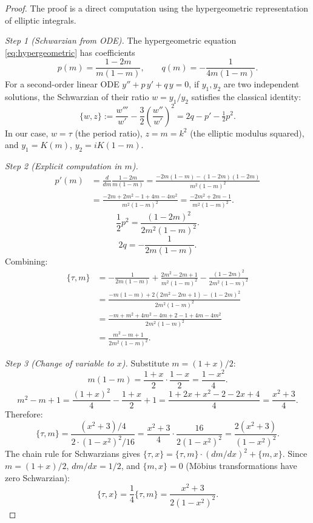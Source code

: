 \documentclass[12pt]{article}
\theoremstyle{plain}
\theoremstyle{definition}
\numberwithin{equation}{section}
\begin{document}
\begin{proof}
The proof is a direct computation using the hypergeometric representation of elliptic integrals.

\emph{Step 1 (Schwarzian from ODE).}
The hypergeometric equation \eqref{eq:hypergeometric} has coefficients
\begin{equation}
p(m)=\frac{1-2m}{m(1-m)},\qquad q(m)=-\frac{1}{4m(1-m)}.
\end{equation}
For a second-order linear ODE $y''+p\,y'+q\,y=0$, if $y_1,y_2$ are two independent solutions, the Schwarzian of their ratio $w=y_1/y_2$ satisfies the classical identity:
\begin{equation}
\{w,z\} := \frac{w'''}{w'}-\frac{3}{2}\left(\frac{w''}{w'}\right)^2 = 2q-p'-\tfrac{1}{2}p^2.
\end{equation}
In our case, $w=\tau$ (the period ratio), $z=m=k^2$ (the elliptic modulus squared), and $y_1=K(m)$, $y_2=iK(1-m)$.

\emph{Step 2 (Explicit computation in $m$).}
\begin{align}
p'(m) &= \frac{d}{dm}\frac{1-2m}{m(1-m)} = \frac{-2m(1-m)-(1-2m)(1-2m)}{m^2(1-m)^2}\\
&= \frac{-2m+2m^2-1+4m-4m^2}{m^2(1-m)^2} = \frac{-2m^2+2m-1}{m^2(1-m)^2}.
\end{align}
\begin{equation}
\frac{1}{2}p^2 = \frac{(1-2m)^2}{2m^2(1-m)^2}.
\end{equation}
\begin{equation}
2q = -\frac{1}{2m(1-m)}.
\end{equation}
Combining:
\begin{align}
\{\tau,m\} &= -\frac{1}{2m(1-m)}+\frac{2m^2-2m+1}{m^2(1-m)^2}-\frac{(1-2m)^2}{2m^2(1-m)^2}\\
&= \frac{-m(1-m)+2(2m^2-2m+1)-(1-2m)^2}{2m^2(1-m)^2}\\
&= \frac{-m+m^2+4m^2-4m+2-1+4m-4m^2}{2m^2(1-m)^2}\\
&= \frac{m^2-m+1}{2m^2(1-m)^2}.
\end{align}

\emph{Step 3 (Change of variable to $x$).}
Substitute $m=(1+x)/2$:
\begin{equation}
m(1-m) = \frac{1+x}{2}\cdot\frac{1-x}{2} = \frac{1-x^2}{4}.
\end{equation}
\begin{equation}
m^2-m+1 = \frac{(1+x)^2}{4}-\frac{1+x}{2}+1 = \frac{1+2x+x^2-2-2x+4}{4} = \frac{x^2+3}{4}.
\end{equation}
Therefore:
\begin{equation}
\{\tau,m\} = \frac{(x^2+3)/4}{2\cdot(1-x^2)^2/16} = \frac{x^2+3}{4}\cdot\frac{16}{2(1-x^2)^2} = \frac{2(x^2+3)}{(1-x^2)^2}.
\end{equation}
The chain rule for Schwarzians gives $\{\tau,x\}=\{\tau,m\}\cdot(dm/dx)^2+\{m,x\}$.  Since $m=(1+x)/2$, $dm/dx=1/2$, and $\{m,x\}=0$ (M\"obius transformations have zero Schwarzian):
\begin{equation}
\{\tau,x\} = \frac{1}{4}\{\tau,m\} = \frac{x^2+3}{2(1-x^2)^2}.
\end{equation}


\end{proof}
\end{document}
